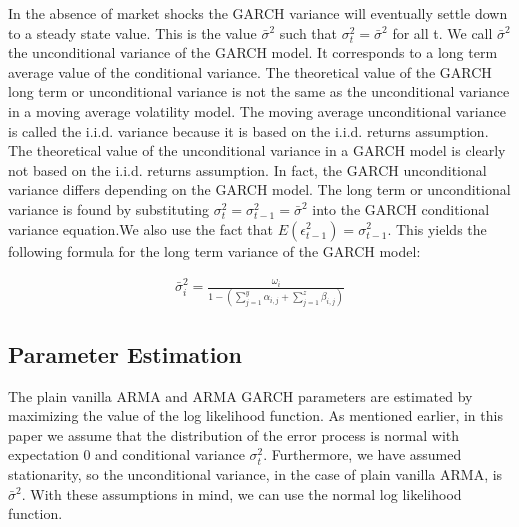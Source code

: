 In the absence of market shocks the GARCH variance will eventually settle down to a steady state value. This is the value $\bar{\sigma}^2$ such that ${\sigma_t^2} = \bar{\sigma}^2$ for all t. We call $\bar{\sigma}^2$ the unconditional variance of the GARCH model. It corresponds to a long term average value of the conditional variance. The theoretical value of the GARCH long term or unconditional variance is not the same as the unconditional variance in a moving average volatility model. The moving average unconditional variance is called the i.i.d. variance because it is based on the i.i.d. returns assumption. The theoretical value of the unconditional variance in a GARCH model is clearly not based on the i.i.d. returns assumption. In fact, the GARCH unconditional variance differs depending on the GARCH model. The long term or unconditional variance is found by substituting ${\sigma_t^2} = {\sigma_{t-1}^2} = \bar{\sigma}^2$ into the GARCH conditional variance equation.We also use the fact that $E(\epsilon_{t-1}^2)=\sigma_{t-1}^2$. This yields the following formula for the long term variance of the GARCH model:

\begin{align}
    \bar{\sigma}_i^2=\frac{\omega_i}{1-(\sum_{j=1}^y\alpha_{i,j}+\sum_{j=1}^z\beta_{i,j})} \label{longTermVolatilityGARCH}
\end{align}

\subsection*{Parameter Estimation}

The plain vanilla ARMA and ARMA GARCH parameters are estimated by maximizing the value of the log likelihood function. As mentioned earlier, in this paper we assume that the distribution of the error process is normal with expectation 0 and conditional variance ${\sigma_t^2}$. Furthermore, we have assumed stationarity, so the unconditional variance, in the case of plain vanilla ARMA, is ${\bar\sigma^2}$. With these assumptions in mind, we can use the normal log likelihood function.
